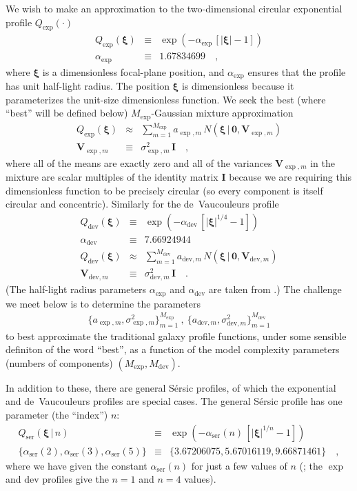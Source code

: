\documentclass[12pt,pdftex,preprint]{aastex}
\newcommand{\tmatrix}[1]{\boldsymbol{#1}}
\newcommand{\tvector}[1]{\boldsymbol{#1}}
\newcommand{\spos}{\tvector{\xi}}
\newcommand{\var}{\tmatrix{V}\!}
\newcommand{\zero}{\tmatrix{0}}
\newcommand{\identity}{\tmatrix{I}}
\newcommand{\normal}{N}
\newcommand{\given}{\,|\,}
\newcommand{\dev}{\mathrm{dev}}
\newcommand{\ser}{\mathrm{ser}}
\begin{document}
We wish to make an approximation to the two-dimensional circular
exponential profile $Q_{\exp}(\cdot)$
\begin{eqnarray}\displaystyle
Q_{\exp}(\spos) &\equiv& \exp(-\alpha_{\exp}\,[|\spos| - 1])
\\
\alpha_{\exp} &\equiv& 1.67834699
\quad ,
\end{eqnarray}
where $\spos$ is a dimensionless focal-plane position, and
$\alpha_{\exp}$ ensures that the profile has unit half-light radius.
The position $\spos$ is dimensionless because it parameterizes the
unit-size dimensionless function.  We seek the best (where ``best''
will be defined below) $M_{\exp}$-Gaussian mixture approximation
\begin{eqnarray}\displaystyle
Q_{\exp}(\spos) &\approx& \sum_{m=1}^{M_{\exp}} a_{\exp,m}\,\normal(\spos\given\zero,\var_{\exp,m})
\\
\var_{\exp,m} &\equiv& \sigma^2_{\exp,m}\,\identity
\quad ,
\end{eqnarray}
where all of the means are exactly zero and all of the variances
$\var_{\exp,m}$ in the mixture are scalar multiples of the identity
matrix $\identity$ because we are requiring this dimensionless
function to be precisely circular (so every component is itself
circular and concentric).  Similarly for the de~Vaucouleurs profile
\begin{eqnarray}\displaystyle
Q_{\dev}(\spos) &\equiv& \exp(-\alpha_{\dev}\,[|\spos|^{1/4} - 1])
\\
\alpha_{\dev} &\equiv& 7.66924944
\\
Q_{\dev}(\spos) &\approx& \sum_{m=1}^{M_{\dev}} a_{\dev,m}\,\normal(\spos\given\zero,\var_{\dev,m})
\\
\var_{\dev,m} &\equiv& \sigma^2_{\dev,m}\,\identity
\quad .
\end{eqnarray}
(The half-light radius parameters $\alpha_{\exp}$ and $\alpha_{\dev}$
are taken from \citealt{ciotti}.)  The challenge we meet below is to
determine the parameters
\begin{eqnarray}
\{a_{\exp,m},\sigma^2_{\exp,m}\}_{m=1}^{M_{\exp}}~,~\{a_{\dev,m},\sigma^2_{\dev,m}\}_{m=1}^{M_{\dev}}
\end{eqnarray}
to best approximate the traditional galaxy profile functions, under
some sensible definiton of the word ``best'', as a function of the
model complexity parameters (numbers of components) $(M_{\exp},
M_{\dev})$.

In addition to these, there are general S\'ersic profiles, of which
the exponential and de~Vaucouleurs profiles are special cases.  The
general S\'ersic profile has one parameter (the ``index'') $n$:
\begin{eqnarray}\displaystyle
Q_{\ser}(\spos\given n) &\equiv& \exp(-\alpha_{\ser}(n)\,[|\spos|^{1/n} - 1])
\\
\{\alpha_{\ser}(2), \alpha_{\ser}(3), \alpha_{\ser}(5)\} &\equiv& \{3.67206075, 5.67016119, 9.66871461\}
\quad ,
\end{eqnarray}
where we have given the constant $\alpha_{\ser}(n)$ for just a few
values of $n$ (\citealt{ciotti}; the $\exp$ and $\dev$ profiles give
the $n=1$ and $n=4$ values).
\end{document}
